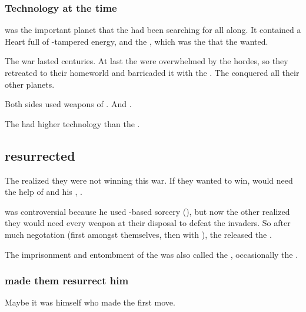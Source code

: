 \subsubsection{Technology at the time}
\Miith was the important planet that the \banes had been searching for all along. 
It contained a Heart full of \voyager-tampered energy, and the \noggyal {}, which was the  that the \banes wanted. 

The war lasted centuries. 
At last the \ophidians were overwhelmed by the \bane hordes, so they retreated to their homeworld and barricaded it with the \CrystalSphere. 
The \banes conquered all their other planets. 

Both sides used weapons of . 
And . 

The \ophidians had higher technology than the \banes. 








\subsection{\Sethicus resurrected}
The \ophidians realized they were not winning this war.
If they wanted to win, would need the help of \Sethicus and his \dragons, . 

 was controversial because he used \xs-based sorcery (), but now the other \ophidians{} realized they would need every weapon at their disposal to defeat the \bane{} invaders. 
So after much negotation (first amongst themselves, then with \Sethicus), the \ophidians released the \dragons. 

The imprisonment and entombment of the \dragons was also called the , occasionally the .




\subsubsection{\Sethicus made them resurrect him}
Maybe it was \Sethicus himself who made the first move. 

